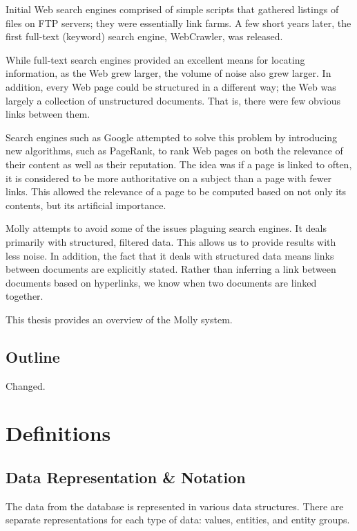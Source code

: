 \documentclass[12pt,letterpaper,oneside,notitlepage]{report}
\theoremstyle{definition}
\begin{document}
			Initial Web search engines comprised of simple scripts that gathered listings of files on FTP servers; they were essentially link farms.  A few short years later, the first full-text (keyword) search engine, WebCrawler, was released.
		
			While full-text search engines provided an excellent means for locating information, as the Web grew larger, the volume of noise also grew larger.  In addition, every Web page could be structured in a different way; the Web was largely a collection of unstructured documents.  That is, there were few obvious links between them.
		
			Search engines such as Google attempted to solve this problem by introducing new algorithms, such as PageRank, to rank Web pages on both the relevance of their content as well as their reputation.  The idea was if a page is linked to often, it is considered to be more authoritative on a subject than a page with fewer links.  This allowed the relevance of a page to be computed based on not only its contents, but its artificial importance.
		
			Molly attempts to avoid some of the issues plaguing search engines.  It deals primarily with structured, filtered data.  This allows us to provide results with less noise.  In addition, the fact that it deals with structured data means links between documents are explicitly stated.  Rather than inferring a link between documents based on hyperlinks, we know when two documents are linked together.
		
			This thesis provides an overview of the Molly system.
		
		\section*{Outline}
			Changed.

	\tableofcontents

	\listoftables
	\listoffigures
	\listofalgorithms

	\clearpage
	
	\chapter{Definitions}
		\section{Data Representation \& Notation}
		\label{sec:data-representation-notation}
			The data from the database is represented in various data structures.  There are separate representations for each type of data:  values, entities, and entity groups.
\end{document}
